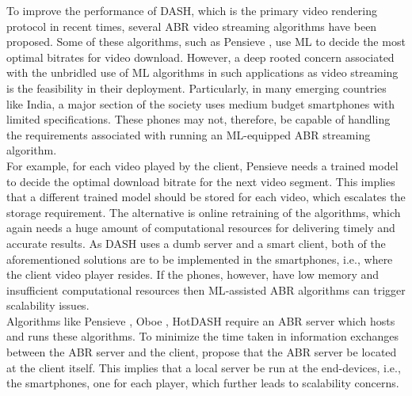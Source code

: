 

\vspace{1cm}


To improve the performance of \ac{DASH}, which is the primary video rendering protocol in recent times,  several \ac{ABR} video streaming algorithms have been proposed. Some of these algorithms, such as Pensieve \cite{Mao2017}, use \ac{ML} to decide the most optimal bitrates for video download. However, a deep rooted concern associated with the unbridled use of \ac{ML} algorithms in such applications as video streaming is the feasibility in their deployment. Particularly, in many emerging countries like India, a major section of the society uses medium budget smartphones with limited specifications. These phones may not, therefore, be capable of handling the requirements associated with running an \ac{ML}-equipped \ac{ABR} streaming algorithm.\\
\indent For example, for each video played by the client, Pensieve \cite{Mao2017} needs a trained model to decide the optimal download bitrate for the next video segment. This implies that  a different trained model should be stored for each video, which escalates the storage requirement. The alternative is online retraining of the algorithms, which again needs a huge amount of computational resources for delivering timely and accurate results. As DASH uses a dumb server and a smart client, both of the aforementioned solutions are to be implemented in the smartphones, i.e., where the client video player resides.  If the phones, however, have low memory and insufficient computational resources then \ac{ML}-assisted \ac{ABR} algorithms can trigger scalability issues.\\
\indent Algorithms like Pensieve \cite{Mao2017}, Oboe \cite{Akhtar2018}, HotDASH \cite{Sengupta2018} require an  ABR server which hosts and runs these algorithms. To minimize the time taken in information exchanges between the \ac{ABR} server and the client, \cite{Mao2017,Akhtar2018,Sengupta2018} propose that the \ac{ABR} server be located at the client itself. This implies that a local server be run at the end-devices, i.e., the smartphones, one for each player, which further leads to scalability concerns.\\

